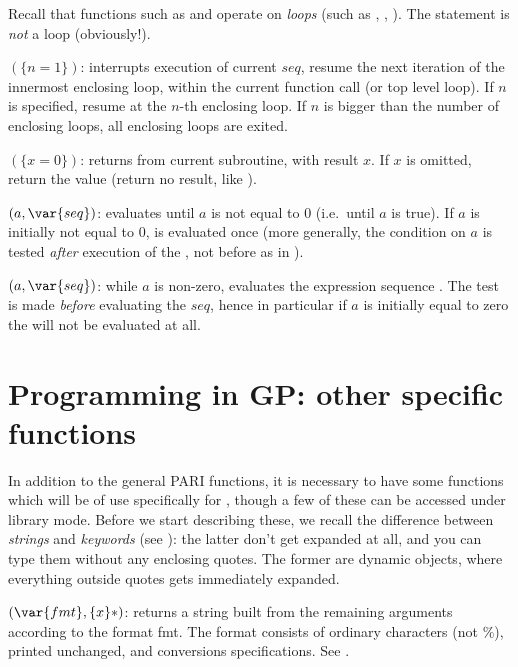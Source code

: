 Recall that functions such as  and  operate on
\emph{loops} (such as , , ). The 
statement is \emph{not} a loop (obviously!).

$(\{n=1\})$: \label{se:next}interrupts execution of current $seq$,
resume the next iteration of the innermost enclosing loop, within the
current function call (or top level loop). If $n$ is specified, resume at
the $n$-th enclosing loop. If $n$ is bigger than the number of enclosing
loops, all enclosing loops are exited.

$(\{x=0\})$: \label{se:return}returns from current subroutine, with
result $x$. If $x$ is omitted, return the  value (return no
result, like ).

$(a,\var{seq})$: \label{se:until}evaluates  until $a$ is not
equal to 0 (i.e.~until $a$ is true). If $a$ is initially not equal to 0,
 is evaluated once (more generally, the condition on $a$ is tested
\emph{after} execution of the , not before as in ).

$(a,\var{seq})$: \label{se:while}while $a$ is non-zero, evaluates the expression sequence . The
test is made \emph{before} evaluating the $seq$, hence in particular if $a$
is initially equal to zero the  will not be evaluated at all.

\section{Programming in GP: other specific functions}
\label{se:gp_program}

  In addition to the general PARI functions, it is necessary to have some
functions which will be of use specifically for , though a few of these can
be accessed under library mode. Before we start describing these, we recall
the difference between \emph{strings} and \emph{keywords} (see
): the latter don't get expanded at all, and you can type
them without any enclosing quotes. The former are dynamic objects, where
everything outside quotes gets immediately expanded.


$(\var{fmt},\{x\}*)$: \label{se:Strprintf}returns a string built from the remaining arguments according to the
format fmt. The format consists of ordinary characters (not \%), printed
unchanged, and conversions specifications. See .

